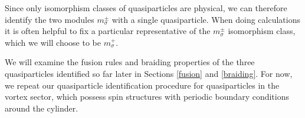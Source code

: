 \documentclass[12pt,a4paper]{article}
\newcommand{\cc}{\mathbb{C}}
\newcommand{\End}{\text{End}}
\newcommand{\ethan}[1]{{\color{amethyst}\footnotesize{(EL) #1}}}
\begin{document}
Since only isomorphism classes of quasiparticles are physical, we can therefore identify the two modules $m_\sigma^\pm$ with a single quasiparticle. 
When doing calculations it is often helpful to fix a particular representative of the $m_\sigma^\pm$ isomorphism class, which we will choose to be $m_\sigma^+$. 

We will examine the fusion rules and braiding properties of the three quasiparticles identified so far later in Sections \ref{fusion} and \ref{braiding}. 
For now, we repeat our quasiparticle identification procedure for quasiparticles in the vortex sector, which possess spin structures with periodic boundary conditions around the cylinder. 

\end{document}
